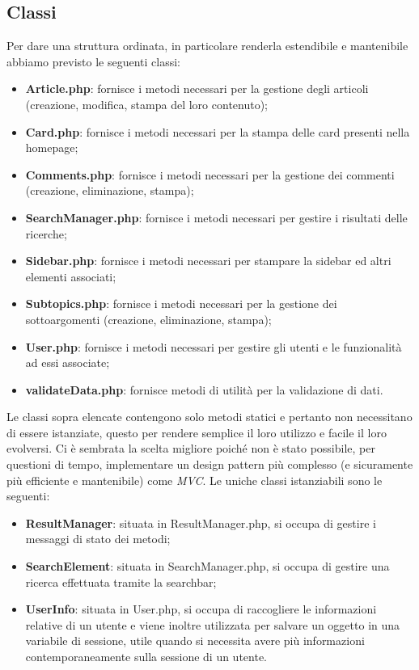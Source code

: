 \documentclass[12pt]{article}
\begin{document}
	\subsection{Classi}
	Per dare una struttura ordinata, in particolare renderla estendibile e mantenibile abbiamo previsto le seguenti classi:
		\begin{itemize}
			\item \textbf{Article.php}: fornisce i metodi necessari per la gestione degli articoli (creazione, modifica, stampa del loro contenuto);
			\item \textbf{Card.php}: fornisce i metodi necessari per la stampa delle card presenti nella homepage;
			\item \textbf{Comments.php}: fornisce i metodi necessari per la gestione dei commenti (creazione, eliminazione, stampa);
			\item \textbf{SearchManager.php}: fornisce i metodi necessari per gestire i risultati delle ricerche;
			\item \textbf{Sidebar.php}: fornisce i metodi necessari per stampare la sidebar ed altri elementi associati;
			\item \textbf{Subtopics.php}: fornisce i metodi necessari per la gestione dei sottoargomenti (creazione, eliminazione, stampa);
			\item \textbf{User.php}: fornisce i metodi necessari per gestire gli utenti e le funzionalità ad essi associate;
			\item \textbf{validateData.php}: fornisce metodi di utilità per la validazione di dati.
		\end{itemize}
	Le classi sopra elencate contengono solo metodi statici e pertanto non necessitano di essere istanziate, questo per rendere semplice il loro utilizzo e facile il loro evolversi. Ci è sembrata la scelta migliore poiché non è stato possibile, per questioni di tempo, implementare un design pattern più complesso (e sicuramente più efficiente e mantenibile) come \emph{MVC}.
	Le uniche classi istanziabili sono le seguenti:
	\begin{itemize}
		\item \textbf{ResultManager}: situata in ResultManager.php, si occupa di gestire i messaggi di stato dei metodi;
		\item \textbf{SearchElement}: situata in SearchManager.php, si occupa di gestire una ricerca effettuata tramite la searchbar;
		\item \textbf{UserInfo}: situata in User.php, si occupa di raccogliere le informazioni relative di un utente e viene inoltre utilizzata per salvare un oggetto in una variabile di sessione, utile quando si necessita avere più informazioni contemporaneamente sulla sessione di un utente.
	\end{itemize}
\end{document}
